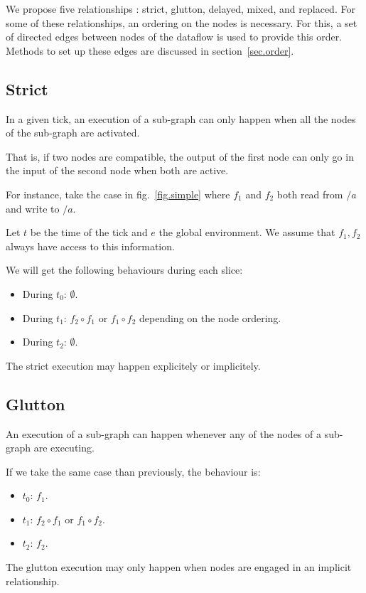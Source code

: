 \documentclass{article}
\begin{document}
We propose five relationships : strict, glutton, delayed, mixed, and replaced. 
For some of these relationships, an ordering on the nodes is necessary. 
For this, a set of directed edges between nodes of the dataflow is used to provide this order.
Methods to set up these edges are discussed in section~\ref{sec.order}.
    
\subsection{Strict}
In a given tick, an execution of a sub-graph can only happen when all the nodes of the sub-graph are activated.
    
That is, if two nodes are compatible, the output of the first node can only go in the input of the second node when both are active.
    
For instance, take the case in fig.~\ref{fig.simple} where $f_1$ and $f_2$ both read from $/a$ and write to $/a$.
    
Let $t$ be the time of the tick and $e$ the global environment. 
We assume that $f_1, f_2$ always have access to this information.
    
We will get the following behaviours during each slice: 
\begin{itemize}
  \item During $t_0$: $\emptyset$.
  \item During $t_1$: $f_2 \circ f_1 $ or $f_1 \circ f_2$ depending on the node ordering.
  \item During $t_2$: $\emptyset$. 
\end{itemize}

The strict execution may happen explicitely or implicitely.
    
\subsection{Glutton}
An execution of a sub-graph can happen whenever any of the nodes of a sub-graph are executing. 
    
If we take the same case than previously, the behaviour is:
\begin{itemize}
  \item $t_0$: $f_1$.
  \item $t_1$: $f_2 \circ f_1$ or $f_1 \circ f_2$.
  \item $t_2$: $f_2$. 
\end{itemize}

The glutton execution may only happen when nodes are engaged in an implicit relationship.
    
\end{document}
